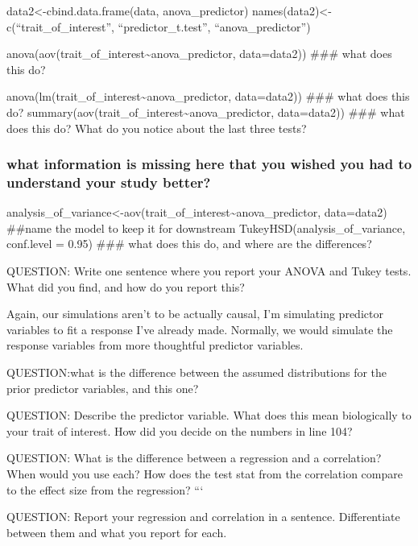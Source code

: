 \documentclass[
]{article}
\begin{document}
data2\textless-cbind.data.frame(data, anova\_predictor)
names(data2)\textless-c(``trait\_of\_interest'', ``predictor\_t.test'',
``anova\_predictor'')

anova(aov(trait\_of\_interest\textasciitilde anova\_predictor,
data=data2)) \#\#\# what does this do?

anova(lm(trait\_of\_interest\textasciitilde anova\_predictor,
data=data2)) \#\#\# what does this do?
summary(aov(trait\_of\_interest\textasciitilde anova\_predictor,
data=data2)) \#\#\# what does this do? What do you notice about the last
three tests?

\subsubsection{what information is missing here that you wished you had
to understand your study
better?}\label{what-information-is-missing-here-that-you-wished-you-had-to-understand-your-study-better}

analysis\_of\_variance\textless-aov(trait\_of\_interest\textasciitilde anova\_predictor,
data=data2) \#\#name the model to keep it for downstream
TukeyHSD(analysis\_of\_variance, conf.level = 0.95) \#\#\# what does
this do, and where are the differences?

QUESTION: Write one sentence where you report your ANOVA and Tukey
tests. What did you find, and how do you report this?

Again, our simulations aren't to be actually causal, I'm simulating
predictor variables to fit a response I've already made. Normally, we
would simulate the response variables from more thoughtful predictor
variables.

QUESTION:what is the difference between the assumed distributions for
the prior predictor variables, and this one?

QUESTION: Describe the predictor variable. What does this mean
biologically to your trait of interest. How did you decide on the
numbers in line 104?

QUESTION: What is the difference between a regression and a correlation?
When would you use each? How does the test stat from the correlation
compare to the effect size from the regression? ```

QUESTION: Report your regression and correlation in a sentence.
Differentiate between them and what you report for each.
\end{document}
